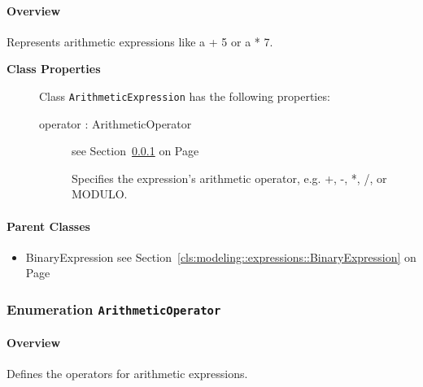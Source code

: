 \paragraph{Overview}

	
			
Represents arithmetic expressions like a + 5 or a * 7.	
		
	


\begin{description}

	\item[\textbf{Class Properties}] Class \texttt{ArithmeticExpression} has the following properties:
	\begin{description}
\item[operator : ArithmeticOperator 	]
see Section~\ref{cls:modeling::expressions::ArithmeticOperator} on Page~\pageref{cls:modeling::expressions::ArithmeticOperator}
\hspace{\fill}
\nopagebreak


	
			
Specifies the expression's arithmetic operator, e.g. +, -, *, /, or MODULO.	
		
	
	\end{description}
	
	

\end{description}

\paragraph{Parent Classes}
\begin{itemize}
\item BinaryExpression see Section~\ref{cls:modeling::expressions::BinaryExpression} on Page~\pageref{cls:modeling::expressions::BinaryExpression}\end{itemize}
\subsubsection{\Large{Enumeration \bfseries \texttt{ArithmeticOperator}\normalfont}}
\label{cls:modeling::expressions::ArithmeticOperator} 
\paragraph{Overview}
	
			
Defines the operators for arithmetic expressions.	
		
	


